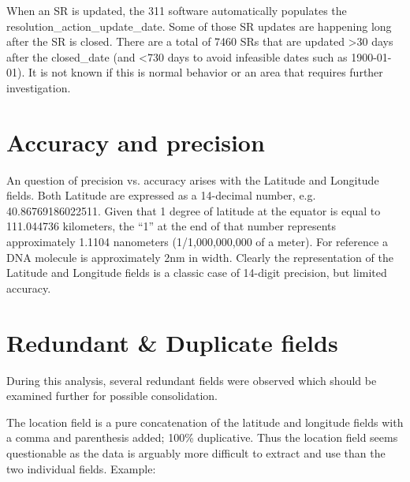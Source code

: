\documentclass[12pt, titlepage]{article}
\begin{document}
		
\label{sec: resolutionaction}
When an SR is updated, the 311 software automatically 
populates the resolution\_action\_update\_date. Some of 
those SR updates are happening long after the SR is 
closed. There are a total of 7460 SRs that are updated \textgreater30 days 
after the closed\_date (and \textless{}730 days to avoid infeasible 
dates such as 1900-01-01). It is not known if this is normal behavior
 or an area that requires further investigation. 
	
	


	
\section{Accuracy and precision}
\label{sec:precision}
An question of precision vs. accuracy arises with the Latitude 
and Longitude fields. Both Latitude are 
expressed as a 14-decimal number, e.g. 40.86769186022511. Given 
that 1 degree of latitude at the equator is equal to 111.044736 
kilometers, the ``1'' at the end of that number represents 
approximately 1.1104 nanometers (1/1,000,000,000 of a meter). For 
reference a DNA molecule is approximately 2nm in width. Clearly 
the representation of the Latitude and Longitude fields is a 
classic case of 14-digit precision, but limited accuracy. 



\section{Redundant \& Duplicate fields}\label{sec:duplicates}
During this analysis, several redundant fields were observed which
should be examined further for possible consolidation.

\label{sec:latlong}
The location field is a pure concatenation of the latitude 
and longitude fields with a comma and parenthesis 
added; 100\% duplicative. Thus the  location field seems questionable 
as the data is arguably more difficult to extract and use than the 
two individual fields. Example:  
\end{document}
